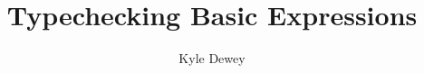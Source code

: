 \documentclass[10pt]{article}
\begin{document}
\title{Typechecking Basic Expressions}
\author{Kyle Dewey}
\date{}
\maketitle




\end{document}
